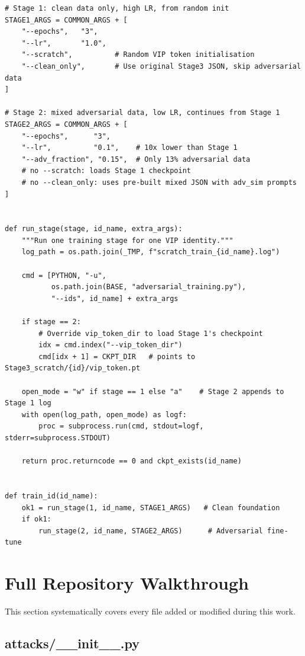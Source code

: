 \documentclass[12pt,a4paper]{article}
\begin{document}
\begin{lstlisting}[caption={scratch\_adv\_training.py -- Two-stage curriculum orchestrator}]
# Stage 1: clean data only, high LR, from random init
STAGE1_ARGS = COMMON_ARGS + [
    "--epochs",   "3",
    "--lr",       "1.0",
    "--scratch",          # Random VIP token initialisation
    "--clean_only",       # Use original Stage3 JSON, skip adversarial data
]

# Stage 2: mixed adversarial data, low LR, continues from Stage 1
STAGE2_ARGS = COMMON_ARGS + [
    "--epochs",      "3",
    "--lr",          "0.1",    # 10x lower than Stage 1
    "--adv_fraction", "0.15",  # Only 13% adversarial data
    # no --scratch: loads Stage 1 checkpoint
    # no --clean_only: uses pre-built mixed JSON with adv_sim prompts
]


def run_stage(stage, id_name, extra_args):
    """Run one training stage for one VIP identity."""
    log_path = os.path.join(_TMP, f"scratch_train_{id_name}.log")

    cmd = [PYTHON, "-u",
           os.path.join(BASE, "adversarial_training.py"),
           "--ids", id_name] + extra_args

    if stage == 2:
        # Override vip_token_dir to load Stage 1's checkpoint
        idx = cmd.index("--vip_token_dir")
        cmd[idx + 1] = CKPT_DIR   # points to Stage3_scratch/{id}/vip_token.pt

    open_mode = "w" if stage == 1 else "a"    # Stage 2 appends to Stage 1 log
    with open(log_path, open_mode) as logf:
        proc = subprocess.run(cmd, stdout=logf, stderr=subprocess.STDOUT)

    return proc.returncode == 0 and ckpt_exists(id_name)


def train_id(id_name):
    ok1 = run_stage(1, id_name, STAGE1_ARGS)   # Clean foundation
    if ok1:
        run_stage(2, id_name, STAGE2_ARGS)      # Adversarial fine-tune
\end{lstlisting}

\section{Full Repository Walkthrough}

This section systematically covers every file added or modified during this work.

\subsection{attacks/\_\_init\_\_.py}
\end{document}
